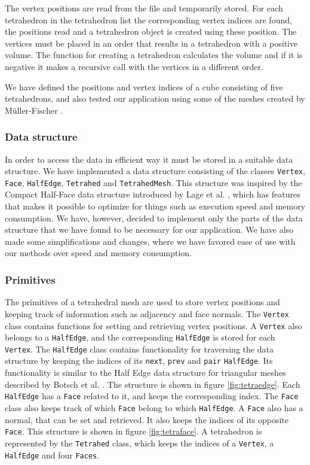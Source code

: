\documentclass[10pt,a4paper]{article}
\begin{document}
The vertex positions are read from the file and temporarily stored. For each tetrahedron in the tetrahedron list the corresponding vertex indices are found, the positions read and a tetrahedron object is created using these position. The vertices must be placed in an order that results in a tetrahedron with a positive volume. The function for creating a tetrahedron calculates the volume and if it is negative it makes a recursive call with the vertices in a different order.

We have defined the positions and vertex indices of a cube consisting of five tetrahedrons, and also tested our application using some of the meshes created by M\"uller-Fischer \cite{meshes}.


\subsubsection{Data structure}
In order to access the data in efficient way it must be stored in a suitable data structure. We have implemented a data structure consisting of the classes \texttt{Vertex}, \texttt{Face}, \texttt{HalfEdge}, \texttt{Tetrahed} and \texttt{TetrahedMesh}. This structure was inspired by the Compact Half-Face data structure introduced by Lage et al. \cite{halfface}, which has features that makes it possible to optimize for things such as execution speed and memory consumption. We have, however, decided to implement only the parts of the data structure that we have found to be necessary for our application. We have also made some simplifications and changes, where we have favored ease of use with our methods over speed and memory consumption.

\subsubsection{Primitives}
The primitives of a tetrahedral mesh are used to store vertex positions and keeping track of information such as adjacency and face normals. The \texttt{Vertex} class contains functions for setting and retrieving vertex positions. A \texttt{Vertex} also belongs to a \texttt{HalfEdge}, and the corresponding \texttt{HalfEdge} is stored for each \texttt{Vertex}. The \texttt{HalfEdge} class contains functionality for traversing the data structure by keeping the indices of its \texttt{next}, \texttt{prev} and \texttt{pair} \texttt{HalfEdge}. Its functionality is similar to the Half Edge data structure for triangular meshes described by Botsch et al. \cite{Botsch}. The structure is shown in figure \ref{fig:tetraedge}. Each \texttt{HalfEdge} has a \texttt{Face} related to it, and keeps the corresponding index. The \texttt{Face} class also keeps track of which \texttt{Face} belong to which \texttt{HalfEdge}. A \texttt{Face} also has a normal, that can be set and retrieved. It also keeps the indices of its opposite \texttt{Face}. This structure is shown in figure \ref{fig:tetraface}. A tetrahedron is represented by the \texttt{Tetrahed} class, which keeps the indices of a \texttt{Vertex}, a \texttt{HalfEdge} and four \texttt{Faces}.
\end{document}
